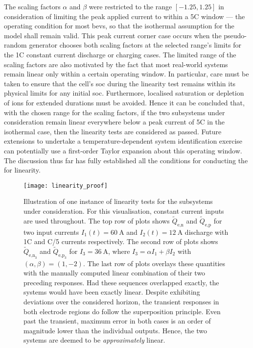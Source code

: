 The  scaling  factors  $\alpha$  and   $\beta$  were  restricted  to  the  range
$[-1.25,1.25]$ in consideration of limiting the peak applied current to within a
\pm 5C  window ---  the operating  condition for most  \glspl{bev}, so  that the
isothermal assumption for the model shall remain valid. This peak current corner
case occurs when the pseudo-random generator chooses both scaling factors at the
selected range's limits for the 1C constant current discharge or charging cases.
The limited  range of the  scaling factors are also  motivated by the  fact that
most real-world systems remain linear only within a certain operating window. In
particular, care  must be taken to  ensure that the cell's  \gls{soc} during the
linearity test  remains within  its physical limits  for any  initial \gls{soc}.
Furthermore, localised  saturation or depletion  of ions for  extended durations
must be avoided. Hence  it can be concluded that, with the  chosen range for the
scaling  factors,  if  the  two subsystems  under  consideration  remain  linear
everywhere below  a peak  current of  \pm 5C  in the  isothermal case,  then the
linearity  tests are  considered as  passed.  Future extensions  to undertake  a
temperature-dependent  system  identification  exercise can  potentially  use  a
first-order Taylor  expansion about this  operating window. The  discussion thus
far has fully established all the conditions for conducting the for linearity.

\begin{figure}[!htb]
    \centering
    \texttt{[image: linearity\_proof]}
    \caption[Illustration of linearity test for the
     and
     subsystems]{Illustration of one
        instance of linearity tests for the subsystems under consideration. For
        this visualisation, constant current inputs are used throughout. The top
        row of plots shows $\widetilde{Q}_{\text{e,n}}$ and
        $\widetilde{Q}_{\text{e,p}}$ for two input currents $I_1(t) =
        \SI{60}{\ampere}$ and $I_2(t) = \SI{12}{\ampere}$ \ie{} discharge with
        1C and C/5 currents respectively. The second row of plots shows
        $\widetilde{Q}_{\text{e,n}_3}$ and $\widetilde{Q}_{\text{e,p}_3}$  for
        $I_3 = \SI{36}{\ampere}$, where $I_3 = \alpha I_1 + \beta I_2$ with
        $(\alpha,\beta) = (1,-2)$. The last row of plots overlays these
        quantities with the manually computed linear combination of their two
        preceding responses. Had these sequences overlapped exactly, the systems
        would have been exactly linear. Despite exhibiting deviations over the
        considered horizon, the transient responses in both electrode regions do
        follow the superposition principle. Even past the transient, maximum
        error in both cases is an order of magnitude lower than the individual
        outputs. Hence, the two systems are deemed to be \emph{approximately}
        linear.
    }%
    \label{fig:linearity}
\end{figure}

